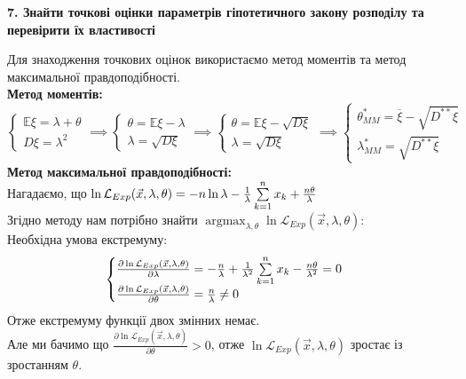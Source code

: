 \documentclass[11 pt]{article}
\DeclareMathOperator*{\argmax}{argmax} %
\begin{document}
\begin{center}
    \large
    \textbf{7. Знайти точкові оцінки параметрів гіпотетичного закону розподілу та перевірити їх властивості}
\end{center}
Для знаходження точкових оцінок використаємо метод моментів та метод максимальної правдоподібності.\\ 
\textbf{Метод моментів:}\\ 
$$
\begin{cases}
    \mathbb{E} \xi = \lambda + \theta \\ 
    D \xi = \lambda^2
\end{cases}
\implies
\begin{cases}
    \theta = \mathbb{E} \xi - \lambda  \\ 
    \lambda = \sqrt{D \xi} 
\end{cases}
\implies
\begin{cases}
    \theta = \mathbb{E} \xi - \sqrt{D \xi}  \\ 
    \lambda = \sqrt{D \xi} 
\end{cases}
\implies
\begin{cases}
    \theta^*_{MM} = \overline{\xi} - \sqrt{D^{**} \xi}  \\ 
    \lambda^*_{MM} = \sqrt{D^{**} \xi} 
\end{cases}
$$
\textbf{Метод максимальної правдоподібності:}\\
Нагадаємо, що 
$
\ln{\mathcal{L}_{Exp}(\vec{x}, \lambda, \theta)} = 
-n \ln{\lambda} - \frac{1}{\lambda}\sum_{k=1}^{n}\limits x_k + \frac{n \theta}{\lambda}
$ \\ 
Згідно методу нам потрібно знайти $\argmax_{\lambda, \theta}\limits \ln{\mathcal{L}_{Exp}(\vec{x}, \lambda, \theta)}$:
\\ 
Необхідна умова екстремуму:\\
$$
\begin{cases}
    \frac{\partial \ln{\mathcal{L}_{Exp}(\vec{x}, \lambda, \theta)}}{\partial \lambda}
     = -\frac{n}{\lambda} + \frac{1}{\lambda^2} \sum_{k=1}^{n}\limits x_k 
     - \frac{n \theta}{\lambda^2}= 0 \\ 
    \frac{\partial \ln{\mathcal{L}_{Exp}(\vec{x}, \lambda, \theta)}}{\partial \theta} = 
    \frac{n}{\lambda} \neq  0
\end{cases}
$$
Отже екстремуму функції двох змінних немає. \\ 
Але ми бачимо що
$\frac{\partial \ln{\mathcal{L}_{Exp}(\vec{x}, \lambda, \theta)}}{\partial \theta}>0$, отже
$\ln{\mathcal{L}_{Exp}(\vec{x}, \lambda, \theta)}$ зростає із зростанням $\theta$. \\ 
\end{document}
